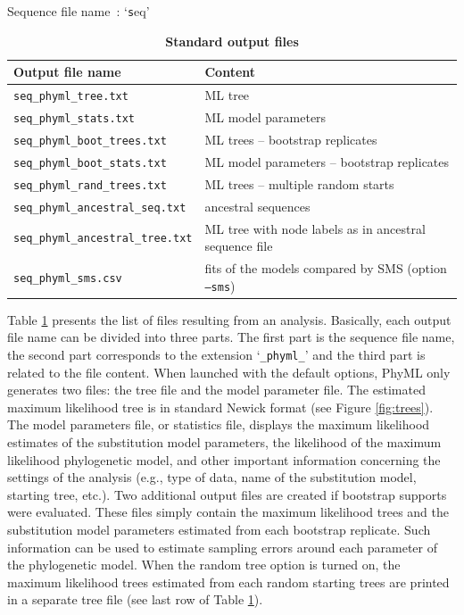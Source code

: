 \documentclass[a4paper,12pt]{article}
\newcommand{\x}[1]{\texttt{#1}}
\begin{document}
\begin{table}
Sequence file name~: `{\x seq}'\\
\begin{center}
\begin{tabular}{ll}
\hline
Output file name & Content \\
\hline
\x{seq\_phyml\_tree.txt} & ML tree\\
\x{seq\_phyml\_stats.txt} &  ML model parameters\\
\x{seq\_phyml\_boot\_trees.txt} & ML trees -- bootstrap replicates\\
\x{seq\_phyml\_boot\_stats.txt} & ML model parameters -- bootstrap replicates \\
\x{seq\_phyml\_rand\_trees.txt} & ML trees -- multiple random starts\\
\x{seq\_phyml\_ancestral\_seq.txt} & ancestral sequences\\
\x{seq\_phyml\_ancestral\_tree.txt} & ML tree with node labels as in ancestral sequence file\\
\x{seq\_phyml\_sms.csv} & fits of the models compared by SMS (option \x{--sms})\\
\hline
\end{tabular}
\end{center}
\caption{{\bf Standard output files}}\label{tab:output}
\end{table}

Table  \ref{tab:output} presents  the list  of files  resulting from  an analysis.   Basically, each
output file  name can be divided into  three parts.  The first  part is the sequence  file name, the
second part corresponds to  the extension `\x{\_phyml\_}' and the third part  is related to the file
content.  When launched with the default options,  PhyML only generates two files: the tree file and
the model parameter file.   The estimated maximum likelihood tree is in  standard Newick format (see
Figure  \ref{fig:trees}).  The  model  parameters file,  or  statistics file,  displays the  maximum
likelihood estimates of the substitution model  parameters, the likelihood of the maximum likelihood
phylogenetic model, and  other important information concerning the settings  of the analysis (e.g.,
type of data, name of the substitution model, starting tree, etc.).  Two additional output files are
created if  bootstrap supports were  evaluated.  These files  simply contain the  maximum likelihood
trees  and  the  substitution  model  parameters  estimated from  each  bootstrap  replicate.   Such
information can be used to estimate sampling errors around each parameter of the phylogenetic model.
When the random  tree option is turned on,  the maximum likelihood trees estimated  from each random
starting trees are printed in a separate tree file (see last row of Table \ref{tab:output}).
\end{document}
